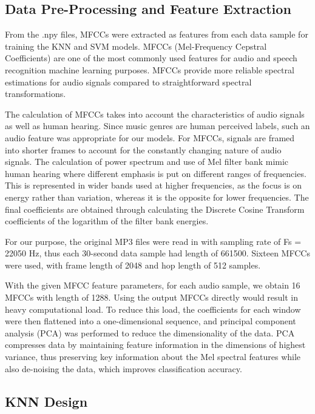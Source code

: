 \documentclass[letterpaper, 12 pt, conference]{ieeeconf}  %
\begin{document}
\subsection{Data Pre-Processing and Feature Extraction}


From the .npy files, MFCCs were extracted as features from each data sample for training the KNN and SVM models. MFCCs (Mel-Frequency Cepstral Coefficients) are one of the most commonly used features for audio and speech recognition machine learning purposes. MFCCs provide more reliable spectral estimations for audio signals compared to straightforward spectral transformations. 

The calculation of MFCCs takes into account the characteristics of audio signals as well as human hearing. Since music genres are human perceived labels, such an audio feature was appropriate for our models. For MFCCs, signals are framed into shorter frames to account for the constantly changing nature of audio signals. The calculation of power spectrum and use of Mel filter bank mimic human hearing where different emphasis is put on different ranges of frequencies. This is represented in wider bands used at higher frequencies, as the focus is on energy rather than variation, whereas it is the opposite for lower frequencies. The final coefficients are obtained through calculating the Discrete Cosine Transform coefficients of the logarithm of the filter bank energies. 

For our purpose, the original MP3 files were read in with sampling rate of Fs = 22050 Hz, thus each 30-second data sample had length of 661500. Sixteen MFCCs were used, with frame length of 2048 and hop length of 512 samples. 

With the given MFCC feature parameters, for each audio sample, we obtain 16 MFCCs with length of 1288. Using the output MFCCs directly would result in heavy computational load. To reduce this load, the coefficients for each window were then flattened into a one-dimensional sequence, and principal component analysis (PCA) was performed to reduce the dimensionality of the data. PCA compresses data by maintaining feature information in the dimensions of highest variance, thus preserving key information about the Mel spectral features while also de-noising the data, which improves classification accuracy.


\subsection{KNN Design}
\end{document}
